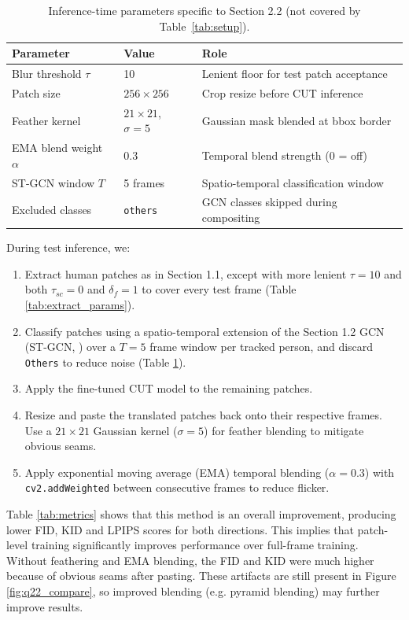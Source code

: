 \begin{table}[h]
  \centering
  \caption{Inference-time parameters specific to Section 2.2 (not covered by Table~\ref{tab:setup}).}
  \label{tab:q22_params}
  \small
  \begin{tabular}{lll}
    \toprule
    Parameter & Value & Role \\
    \midrule
    Blur threshold $\tau$     & 10                & Lenient floor for test patch acceptance \\
    Patch size                & $256\times256$    & Crop resize before CUT inference \\
    Feather kernel            & $21\times21$, $\sigma=5$ & Gaussian mask blended at bbox border \\
    EMA blend weight $\alpha$ & 0.3               & Temporal blend strength (0 = off) \\
    ST-GCN window $T$         & 5 frames          & Spatio-temporal classification window \\
    Excluded classes          & \texttt{others}   & GCN classes skipped during compositing \\
    \bottomrule
  \end{tabular}
\end{table}

During test inference, we:
\begin{enumerate}
  \item Extract human patches as in Section 1.1, except with more lenient $\tau=10$ and both $\tau_{sc}=0$ and $\delta_f=1$ to cover every test frame (Table \ref{tab:extract_params}).
  \item Classify patches using a spatio-temporal extension of the Section 1.2 GCN (ST-GCN, \cite{yan2018stgcn}) over a $T=5$ frame window per tracked person, and discard \texttt{Others} to reduce noise (Table \ref{tab:q22_params}).
  \item Apply the fine-tuned CUT model to the remaining patches.
  \item Resize and paste the translated patches back onto their respective frames. Use a $21\times21$ Gaussian kernel ($\sigma=5$) for feather blending to mitigate obvious seams.
  \item Apply exponential moving average (EMA) temporal blending ($\alpha=0.3$) with \texttt{cv2.addWeighted} \cite{opencv_library} between consecutive frames to reduce flicker.
\end{enumerate}

Table \ref{tab:metrics} shows that this method is an overall improvement, producing lower FID, KID and LPIPS scores for both directions. This implies that patch-level training significantly improves performance over full-frame training. Without feathering and EMA blending, the FID and KID were much higher because of obvious seams after pasting. These artifacts are still present in Figure \ref{fig:q22_compare}, so improved blending (e.g. pyramid blending) may further improve results.

